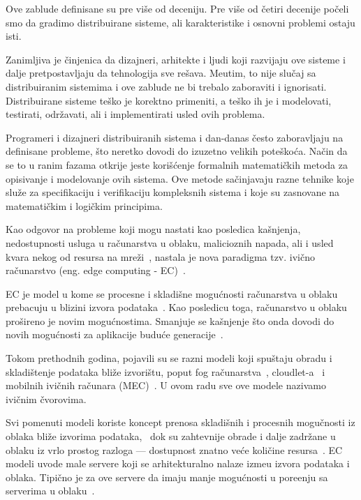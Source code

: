 Ove zablude definisane su pre vi\v se od deceniju. Pre vi\v se od \v cetiri decenije po\v celi smo da gradimo distribuirane sisteme, ali karakteristike i osnovni problemi ostaju isti. 

Zanimljiva je \v cinjenica da dizajneri, arhitekte i ljudi koji razvijaju ove sisteme i dalje pretpostavljaju da tehnologija sve re\v sava. Me\dj utim, to nije slu\v caj sa distribuiranim sistemima i ove zablude ne bi trebalo zaboraviti i ignorisati. Distribuirane sisteme te\v sko je korektno primeniti, a te\v sko ih je i modelovati, testirati, odr\v zavati, ali i implementirati usled ovih problema.

Programeri i dizajneri distribuiranih sistema i dan-danas \v cesto zaboravljaju na definisane probleme, \v sto neretko dovodi do izuzetno velikih pote\v sko\'ca. Na\v cin da se to u ranim fazama otkrije jeste kori\v s\'cenje formalnih matemati\v ckih metoda za opisivanje i modelovanje ovih sistema. Ove metode sa\v cinjavaju razne tehnike koje slu\v ze za specifikaciju i verifikaciju kompleksnih sistema i koje su zasnovane na matemati\v ckim i logi\v ckim principima.

Kao odgovor na probleme koji mogu nastati kao posledica ka\v snjenja, nedostupnosti usluga u ra\v cunarstva u oblaku, malicioznih napada, ali i usled kvara nekog od resursa na mre\v zi~\cite{GunawiHSLSAE16}, nastala je nova paradigma tzv. ivi\v cno ra\v cunarstvo (eng. edge computing - EC)~\cite{Satyanarayanan17}. 

EC je model u kome se procesne i skladi\v sne mogu\'cnosti ra\v cunarstva u oblaku prebacuju u blizini izvora podataka~\cite{Satyanarayanan17}. Kao posledicu toga, ra\v cunarstvo u oblaku pro\v sireno je novim mogu\'cnostima. Smanjuje se ka\v snjenje \v sto onda dovodi do novih mogu\'cnosti za aplikacije budu\'ce generacije~\cite{NingLSY20}.   

Tokom prethodnih godina, pojavili su se razni modeli koji spu\v staju obradu i skladi\v stenje podataka bli\v ze izvori\v stu, poput fog ra\v cunarstva~\cite{BonomiMNZ14}, cloudlet-a~\cite {MonsalveCC18} i mobilnih ivi\v cnih ra\v cunara (MEC)~\cite{WangZZWYW17}. U ovom radu sve ove modele nazivamo ivi\v cnim \v cvorovima. 

Svi pomenuti modeli koriste koncept prenosa skladi\v snih i procesnih mogu\v cnosti iz oblaka bli\v ze izvorima podataka,~\cite{KhuneP19} dok su zahtevnije obrade i dalje zadr\v zane u oblaku iz vrlo prostog razloga --- dostupnost znatno ve\'ce koli\v cine resursa~\cite{NingLSY20}. EC modeli uvode male servere koji se arhitekturalno nalaze izme\dj u izvora podataka i oblaka. Tipi\v cno je za ove servere da imaju manje mogu\'cnosti u pore\dj enju sa serverima u oblaku~\cite{ChenHLLW15}. 

